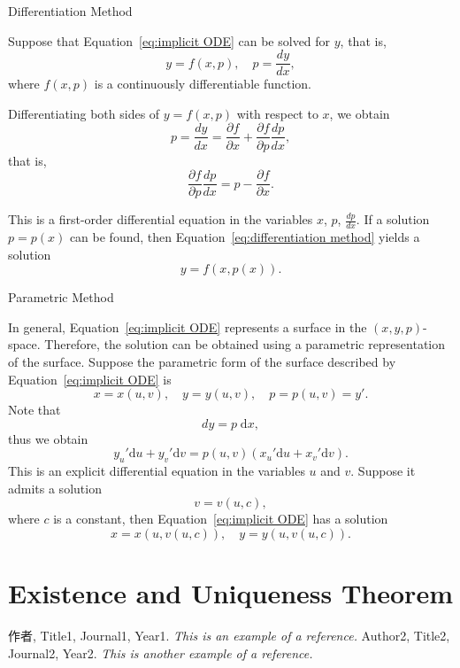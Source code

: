 \documentclass[11pt]{elegantbook}
\begin{document}
\begin{leftbarTitle}{Differentiation Method}\end{leftbarTitle}
Suppose that Equation~\eqref{eq:implicit ODE} can be solved for \(y\), that is,
\begin{equation}\label{eq:differentiation method}
    y = f(x, p),\quad p = \frac{dy}{dx},
\end{equation}
where \(f(x, p)\) is a continuously differentiable function.

Differentiating both sides of \(y = f(x, p)\) with respect to \(x\), we obtain
\[
p = \frac{dy}{dx} = \frac{\partial f}{\partial x} + \frac{\partial f}{\partial p} \frac{dp}{dx},
\]
that is,
\begin{equation*}
\frac{\partial f}{\partial p} \frac{dp}{dx} = p - \frac{\partial f}{\partial x}.
\end{equation*}

This is a first-order differential equation in the variables \(x\), \(p\), \(\frac{dp}{dx}\). 
If a solution \(p = p(x)\) can be found, then Equation~\eqref{eq:differentiation method} yields a solution
\[
y = f(x, p(x)).
\]
\begin{leftbarTitle}{Parametric Method}\end{leftbarTitle}
In general, Equation~\eqref{eq:implicit ODE} represents a surface in the \((x, y, p)\)-space. 
Therefore, the solution can be obtained using a parametric representation of the surface. 
Suppose the parametric form of the surface described by Equation~\eqref{eq:implicit ODE} is
\[
x = x(u, v),\quad y = y(u, v),\quad p = p(u, v) = y'.
\]
Note that
\[
dy = p \; \mathrm{d}x,
\]
thus we obtain
\[
y_u' \mathrm{d}u + y_v' \mathrm{d}v = p(u, v)(x_u' \mathrm{d}u + x_v' \mathrm{d}v).
\]
This is an explicit differential equation in the variables \(u\) and \(v\). Suppose it admits a solution
\[
v = v(u, c),
\]
where \(c\) is a constant, then Equation~\eqref{eq:implicit ODE} has a solution
\[
x = x(u, v(u, c)),\quad y = y(u, v(u, c)).
\]

\chapter{Existence and Uniqueness Theorem}




\begin{thebibliography}{99} 
 作者, Title1, Journal1, Year1. \emph{ This is an example of a reference.}
 Author2, Title2, Journal2, Year2. \emph{ This is another example of a reference.}
\end{thebibliography}
\end{document}
